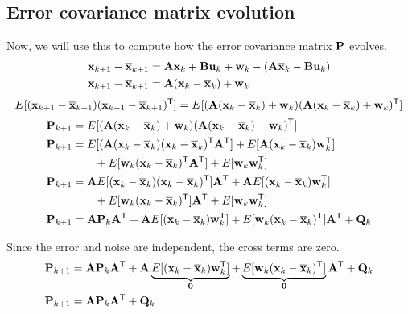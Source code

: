 \subsection{Error covariance matrix evolution}

Now, we will use this to compute how the \gls{error} covariance matrix $\mathbf{P}$
evolves.
\begin{align*}
  \mathbf{x}_{k+1} - \overline{\mathbf{x}}_{k+1} &= \mathbf{A}\mathbf{x}_k +
    \mathbf{B}\mathbf{u}_k + \mathbf{w}_k - (\mathbf{A}\overline{\mathbf{x}}_k - \mathbf{B}\mathbf{u}_k) \\
  \mathbf{x}_{k+1} - \overline{\mathbf{x}}_{k+1} &=
    \mathbf{A}(\mathbf{x}_k - \overline{\mathbf{x}}_k) + \mathbf{w}_k
\end{align*}
\begin{equation*}
  E[(\mathbf{x}_{k+1} - \overline{\mathbf{x}}_{k+1})(\mathbf{x}_{k+1} - \overline{\mathbf{x}}_{k+1})^\mathsf{T}] =
    E[(\mathbf{A}(\mathbf{x}_k - \overline{\mathbf{x}}_k) + \mathbf{w}_k)
      (\mathbf{A}(\mathbf{x}_k - \overline{\mathbf{x}}_k) + \mathbf{w}_k)^\mathsf{T}]
\end{equation*}
\begin{align*}
  \mathbf{P}_{k+1} &=
    E[(\mathbf{A}(\mathbf{x}_k - \overline{\mathbf{x}}_k) + \mathbf{w}_k)
      (\mathbf{A}(\mathbf{x}_k - \overline{\mathbf{x}}_k) + \mathbf{w}_k)^\mathsf{T}] \\
  \mathbf{P}_{k+1} &=
    E[(\mathbf{A}(\mathbf{x}_k - \overline{\mathbf{x}}_k)(\mathbf{x}_k - \overline{\mathbf{x}}_k)^\mathsf{T}
      \mathbf{A}^\mathsf{T}] +
    E[\mathbf{A}(\mathbf{x}_k - \overline{\mathbf{x}}_k)\mathbf{w}_k^\mathsf{T}] \\
    &\qquad + E[\mathbf{w}_k(\mathbf{x}_k - \overline{\mathbf{x}}_k)^\mathsf{T}\mathbf{A}^\mathsf{T}] +
    E[\mathbf{w}_k\mathbf{w}_k^\mathsf{T}] \\
  \mathbf{P}_{k+1} &=
    \mathbf{A}E[(\mathbf{x}_k - \overline{\mathbf{x}}_k)(\mathbf{x}_k - \overline{\mathbf{x}}_k)^\mathsf{T}]
    \mathbf{A}^\mathsf{T} +
    \mathbf{A}E[(\mathbf{x}_k - \overline{\mathbf{x}}_k)\mathbf{w}_k^\mathsf{T}] \\
    &\qquad + E[\mathbf{w}_k(\mathbf{x}_k - \overline{\mathbf{x}}_k)^\mathsf{T}]\mathbf{A}^\mathsf{T} +
    E[\mathbf{w}_k\mathbf{w}_k^\mathsf{T}] \\
  \mathbf{P}_{k+1} &= \mathbf{A}\mathbf{P}_k\mathbf{A}^\mathsf{T} +
    \mathbf{A}E[(\mathbf{x}_k - \overline{\mathbf{x}}_k)\mathbf{w}_k^\mathsf{T}] +
    E[\mathbf{w}_k(\mathbf{x}_k - \overline{\mathbf{x}}_k)^\mathsf{T}]\mathbf{A}^\mathsf{T} + \mathbf{Q}_k
\end{align*}

Since the error and noise are independent, the cross terms are zero.
\begin{align*}
  \mathbf{P}_{k+1} &= \mathbf{A}\mathbf{P}_k\mathbf{A}^\mathsf{T} +
    \mathbf{A}\underbrace{
      E[(\mathbf{x}_k - \overline{\mathbf{x}}_k)\mathbf{w}_k^\mathsf{T}]}_{\mathbf{0}} +
    \underbrace{
      E[\mathbf{w}_k(\mathbf{x}_k - \overline{\mathbf{x}}_k)^\mathsf{T}]}_{\mathbf{0}}\mathbf{A}^\mathsf{T} + \mathbf{Q}_k \\
  \mathbf{P}_{k+1} &= \mathbf{A}\mathbf{P}_k\mathbf{A}^\mathsf{T} + \mathbf{Q}_k
\end{align*}

